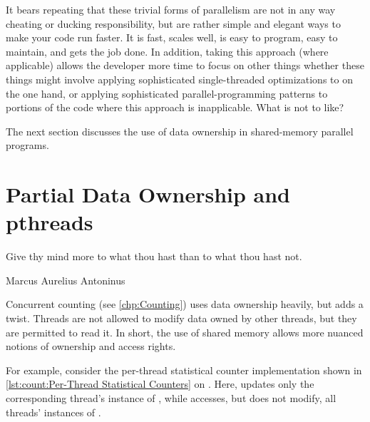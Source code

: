 It bears repeating that these trivial forms of parallelism are not in
any way cheating or ducking responsibility, but are rather simple and
elegant ways to make your code run faster.
It is fast, scales well, is easy to program, easy to maintain, and
gets the job done.
In addition, taking this approach (where applicable) allows the developer
more time to focus on other things whether these things might involve
applying sophisticated single-threaded optimizations to 
on the one hand, or applying sophisticated parallel-programming patterns
to portions of the code where this approach is inapplicable.
What is not to like?

The next section discusses the use of data ownership in shared-memory
parallel programs.

\section{Partial Data Ownership and pthreads}
\label{sec:owned:Partial Data Ownership and pthreads}
%
\epigraph{Give thy mind more to what thou hast than to what thou hast not.}
	 {Marcus Aurelius Antoninus}

Concurrent counting (see \cref{chp:Counting}) uses data ownership heavily,
but adds a twist.
Threads are not allowed to modify data owned by other threads,
but they are permitted to read it.
In short, the use of shared memory allows more nuanced notions
of ownership and access rights.

For example, consider the per-thread statistical counter implementation
shown in
\cref{lst:count:Per-Thread Statistical Counters} on
.
Here,  updates only the corresponding thread's
instance of ,
while  accesses, but does not modify, all
threads' instances of .

\QuickQuizEnd

